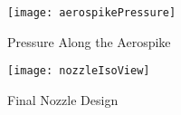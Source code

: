 \begin{figure}[H]
\begin{center}
\texttt{[image: aerospikePressure]}
\caption{Pressure Along the Aerospike}
\label{fig:aerospikePressure}
\end{center}
\end{figure}

\begin{figure}[H]
\begin{center}
\texttt{[image: nozzleIsoView]}
\caption{Final Nozzle Design}
\label{fig:nozzleIsoView}
\end{center}
\end{figure}
